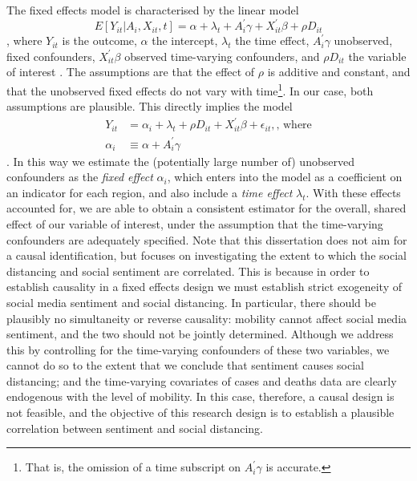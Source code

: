 \documentclass{article}
\begin{document}
The fixed effects model is characterised by the linear model  
\begin{equation}
  E[Y_{it} | A_i , X_{it}, t] = \alpha + \lambda_t + A^\prime_i \gamma + X^\prime_{it} \beta + \rho D_{it}
\end{equation}
, where \(Y_{it}\) is the outcome, \(\alpha\) the intercept, \(\lambda_t\) the time effect, \(A^\prime_i \gamma\) unobserved, fixed confounders, \(X^\prime_{it} \beta\) observed time-varying confounders, and \(\rho D_{it}\) the variable of interest \parencite[222]{angristMostlyHarmlessEconometrics2009a}. The assumptions are that the effect of \(\rho\) is additive and constant, and that the unobserved fixed effects do not vary with time\footnote{That is, the omission of a time subscript on \(A^\prime_i \gamma\) is accurate.}. In our case, both assumptions are plausible. This directly implies the model 
\begin{align}
  Y_{it} &= \alpha_i + \lambda_t + \rho D_{it} + X^\prime_{it} \beta + \epsilon_{it}, \textrm{, where} \\
  \alpha_i &\equiv \alpha + A_i^\prime \gamma
\end{align}. In this way we estimate the (potentially large number of) unobserved confounders as the \textit{fixed effect} \(\alpha_i\), which enters into the model as a coefficient on an indicator for each region, and also include a \textit{time effect} \(\lambda_t\). With these effects accounted for, we are able to obtain a consistent estimator for the overall, shared effect of our variable of interest, under the assumption that the time-varying confounders are adequately specified. Note that this dissertation does not aim for a causal identification, but focuses on investigating the extent to which the social distancing and social sentiment are correlated. This is because in order to establish causality in a fixed effects design we must establish strict exogeneity of social media sentiment and social distancing. In particular, there should be plausibly no simultaneity or reverse causality: mobility cannot affect social media sentiment, and the two should not be jointly determined. Although we address this by controlling for the time-varying confounders of these two variables, we cannot do so to the extent that we conclude that sentiment causes social distancing; and the time-varying covariates of cases and deaths data are clearly endogenous with the level of mobility. In this case, therefore, a causal design is not feasible, and the objective of this research design is to establish a plausible correlation between sentiment and social distancing.
\end{document}
